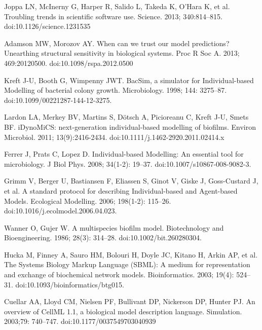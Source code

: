 \documentclass[10pt,letterpaper]{article}
\begin{document}
%
%
% 
\begin{thebibliography}{10}
Joppa LN, McInerny G, Harper R, Salido L, Takeda K, O’Hara K, et al. Troubling trends in scientific software use. Science. 2013; 340:814–815. doi:10.1126/science.1231535

Adamson MW, Morozov AY. When can we trust our model predictions? Unearthing structural sensitivity in biological systems. Proc R Soc A. 2013; 469:20120500. doi:10.1098/rspa.2012.0500


Kreft J-U, Booth G, Wimpenny JWT. BacSim, a simulator for Individual-based Modelling of bacterial colony growth. Microbiology. 1998; 144: 3275–87. doi:10.1099/00221287-144-12-3275.

Lardon LA, Merkey BV, Martins S, Dötsch A, Picioreanu C, Kreft J-U, Smets BF. iDynoMiCS: next-generation individual-based modelling of biofilms. Environ Microbiol. 2011; 13(9):2416-2434. doi:10.1111/j.1462-2920.2011.02414.x

Ferrer J, Prats C, Lopez D. Individual-based Modelling: An essential tool for microbiology. J Biol Phys. 2008; 34(1-2): 19–37. doi:10.1007/s10867-008-9082-3.

Grimm V, Berger U, Bastiansen F, Eliassen S, Ginot V, Giske J, Goss-Custard J, et al. A standard protocol for describing Individual-based and Agent-based Models. Ecological Modelling. 2006; 198(1-2): 115–26. doi:10.1016/j.ecolmodel.2006.04.023.

Wanner O, Gujer W. A multispecies biofilm model. Biotechnology and Bioengineering. 1986; 28(3): 314–28. doi:10.1002/bit.260280304.

Hucka M, Finney A, Sauro HM, Bolouri H, Doyle JC, Kitano H, Arkin AP, et al. The Systems Biology Markup Language (SBML): A medium for representation and exchange of biochemical network models. Bioinformatics. 2003; 19(4): 524–31. doi:10.1093/bioinformatics/btg015.

Cuellar AA, Lloyd CM, Nielsen PF, Bullivant DP, Nickerson DP, Hunter PJ. An overview of CellML 1.1, a biological model description language. Simulation. 2003;79: 740–747. doi:10.1177/0037549703040939


\end{thebibliography}
\end{document}
